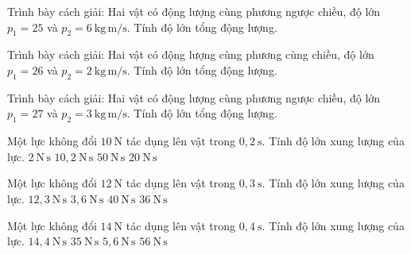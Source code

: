 \begin{bt}
Trình bày cách giải: Hai vật có động lượng cùng phương ngược chiều, độ lớn $p_1=25$ và $p_2=6\ \mathrm{kg\,m/s}$. Tính độ lớn tổng động lượng.
\end{bt}

\begin{bt}
Trình bày cách giải: Hai vật có động lượng cùng phương cùng chiều, độ lớn $p_1=26$ và $p_2=2\ \mathrm{kg\,m/s}$. Tính độ lớn tổng động lượng.
\end{bt}

\begin{bt}
Trình bày cách giải: Hai vật có động lượng cùng phương ngược chiều, độ lớn $p_1=27$ và $p_2=3\ \mathrm{kg\,m/s}$. Tính độ lớn tổng động lượng.
\end{bt}

\begin{ex}
Một lực không đổi $10\ \mathrm{N}$ tác dụng lên vật trong $0,2\ \mathrm{s}$. Tính độ lớn xung lượng của lực.
\choice
{\True $2\ \mathrm{N\,s}$}
{$10,2\ \mathrm{N\,s}$}
{$50\ \mathrm{N\,s}$}
{$20\ \mathrm{N\,s}$}
\end{ex}

\begin{ex}
Một lực không đổi $12\ \mathrm{N}$ tác dụng lên vật trong $0,3\ \mathrm{s}$. Tính độ lớn xung lượng của lực.
\choice
{$12,3\ \mathrm{N\,s}$}
{\True $3,6\ \mathrm{N\,s}$}
{$40\ \mathrm{N\,s}$}
{$36\ \mathrm{N\,s}$}
\end{ex}

\begin{ex}
Một lực không đổi $14\ \mathrm{N}$ tác dụng lên vật trong $0,4\ \mathrm{s}$. Tính độ lớn xung lượng của lực.
\choice
{$14,4\ \mathrm{N\,s}$}
{$35\ \mathrm{N\,s}$}
{\True $5,6\ \mathrm{N\,s}$}
{$56\ \mathrm{N\,s}$}
\end{ex}

